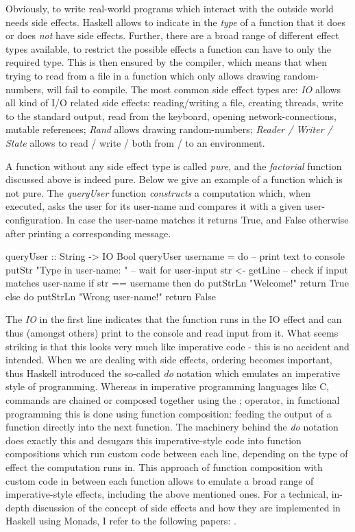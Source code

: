 Obviously, to write real-world programs which interact with the outside world needs side effects. Haskell allows to indicate in the \textit{type} of a function that it does or does \textit{not} have side effects. Further, there are a broad range of different effect types available, to restrict the possible effects a function can have to only the required type. This is then ensured by the compiler, which means that when trying to read from a file in a function which only allows drawing random-numbers, will fail to compile. The most common side effect types are: \textit{IO} allows all kind of I/O related side effects: reading/writing a file, creating threads, write to the standard output, read from the keyboard, opening network-connections, mutable references; \textit{Rand}  allows drawing random-numbers; \textit{Reader / Writer / State} allows to read / write / both from / to an environment.

A function without any side effect type is called \textit{pure}, and the \textit{factorial} function discussed above is indeed pure. Below we give an example of a function which is not pure. The \textit{queryUser} function \textit{constructs} a computation which, when executed, asks the user for its user-name and compares it with a given user-configuration. In case the user-name matches it returns True, and False otherwise after printing a corresponding message. 

\begin{HaskellCode}
queryUser :: String -> IO Bool
queryUser username = do
  -- print text to console
  putStr "Type in user-name: "
  -- wait for user-input
  str <- getLine
  -- check if input matches user-name
  if str == username
    then do
      putStrLn "Welcome!"			
      return True
    else do
      putStrLn "Wrong user-name!"
      return False
\end{HaskellCode}

The \textit{IO} in the first line indicates that the function runs in the IO effect and can thus (amongst others) print to the console and read input from it. What seems striking is that this looks very much like imperative code - this is no accident and intended. When we are dealing with side effects, ordering becomes important, thus Haskell introduced the so-called \textit{do} notation which emulates an imperative style of programming. Whereas in imperative programming languages like C, commands are chained or composed together using the ; operator, in functional programming this is done using function composition: feeding the output of a function directly into the next function. The machinery behind the \textit{do} notation does exactly this and desugars this imperative-style code into function compositions which run custom code between each line, depending on the type of effect the computation runs in. This approach of function composition with custom code in between each function allows to emulate a broad range of imperative-style effects, including the above mentioned ones. For a technical, in-depth discussion of the concept of side effects and how they are implemented in Haskell using Monads, I refer to the following papers: \cite{jones_tackling_2002,moggi_computational_1989,wadler_essence_1992,wadler_monads_1995,wadler_how_1997}.

